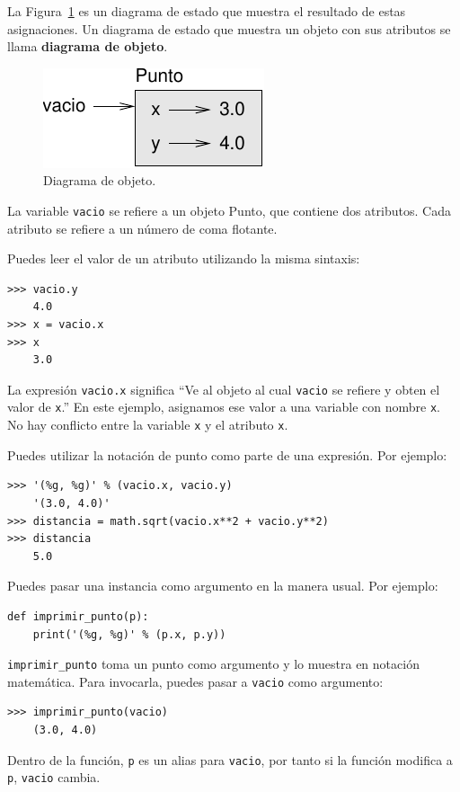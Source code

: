 \documentclass[10pt]{book}
\begin{document}
La Figura~\ref{fig.point} es un diagrama de estado que muestra el resultado de estas asignaciones.
Un diagrama de estado que muestra un objeto con sus atributos se
llama {\bf diagrama de objeto}.


\begin{figure}
\centerline
{\includegraphics[scale=0.8]{figs/point.pdf}}
\caption{Diagrama de objeto.}
\label{fig.point}
\end{figure}

La variable {\tt vacio} se refiere a un objeto Punto, que
contiene dos atributos.  Cada atributo se refiere a un
número de coma flotante.

Puedes leer el valor de un atributo utilizando la misma sintaxis:

\begin{verbatim}
>>> vacio.y
    4.0
>>> x = vacio.x
>>> x
    3.0
\end{verbatim}
%
La expresión {\tt vacio.x} significa ``Ve al objeto al cual {\tt vacio}
se refiere y obten el valor de {\tt x}.''  En este ejemplo, asignamos ese
valor a una variable con nombre {\tt x}.  No hay conflicto entre
la variable {\tt x} y el atributo {\tt x}.

Puedes utilizar la notación de punto como parte de una expresión.  Por ejemplo:

\begin{verbatim}
>>> '(%g, %g)' % (vacio.x, vacio.y)
    '(3.0, 4.0)'
>>> distancia = math.sqrt(vacio.x**2 + vacio.y**2)
>>> distancia
    5.0
\end{verbatim}
%
Puedes pasar una instancia como argumento en la manera usual.
Por ejemplo:

\begin{verbatim}
def imprimir_punto(p):
    print('(%g, %g)' % (p.x, p.y))
\end{verbatim}
%
\verb"imprimir_punto" toma un punto como argumento y lo muestra en
notación matemática.  Para invocarla, puedes pasar a {\tt vacio} como
argumento:

\begin{verbatim}
>>> imprimir_punto(vacio)
    (3.0, 4.0)
\end{verbatim}
%
Dentro de la función, {\tt p} es un alias para {\tt vacio}, por tanto si
la función modifica a {\tt p}, {\tt vacio} cambia.
\end{document}
